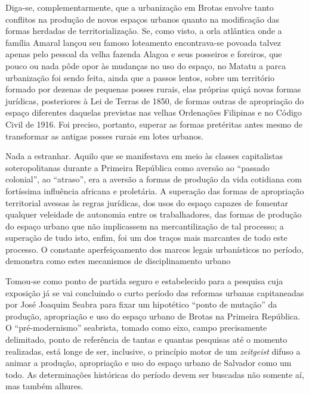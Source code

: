 Diga-se, complementarmente, que a urbanização em Brotas envolve tanto conflitos na produção de novos espaços urbanos quanto na modificação das formas herdadas de territorialização. Se, como visto, a orla atlântica onde a família Amaral lançou seu famoso loteamento encontrava-se povoada talvez apenas pelo pessoal da velha fazenda Alagoa e seus posseiros e foreiros, que pouco ou nada pôde opor às mudanças no uso do espaço, no Matatu a parca urbanização foi sendo feita, ainda que a passos lentos, sobre um território formado por dezenas de pequenas posses rurais, elas próprias quiçá novas formas jurídicas, posteriores à Lei de Terras de 1850, de formas outras de apropriação do espaço diferentes daquelas previstas nas velhas Ordenações Filipinas e no Código Civil de 1916. Foi preciso, portanto, superar as formas pretéritas antes mesmo de transformar as antigas posses rurais em lotes urbanos.

Nada a estranhar. Aquilo que se manifestava em meio às classes capitalistas soteropolitanas durante a Primeira República como aversão ao ``passado colonial'', ao ``atraso'', era a aversão a formas de produção da vida cotidiana com fortíssima influência africana e proletária. A superação das formas de apropriação territorial avessas às regras jurídicas, dos usos do espaço capazes de fomentar qualquer veleidade de autonomia entre os trabalhadores, das formas de produção do espaço urbano que não implicassem na mercantilização de tal processo; a superação de tudo isto, enfim, foi um dos traços mais marcantes de todo este processo. O constante aperfeiçoamento dos marcos legais urbanísticos no período, demonstra como estes mecanismos de disciplinamento urbano 

Tomou-se como ponto de partida seguro e estabelecido para a pesquisa cuja exposição já se vai concluindo o curto período das reformas urbanas capitaneadas por José Joaquim Seabra para fixar um hipotético ``ponto de mutação'' da produção, apropriação e uso do espaço urbano de Brotas na Primeira República. O ``pré-modernismo'' seabrista, tomado como eixo, campo precisamente delimitado, ponto de referência de tantas e quantas pesquisas até o momento realizadas, está longe de ser, inclusive, o princípio motor de um \textit{zeitgeist} difuso a animar a produção, apropriação e uso do espaço urbano de Salvador como um todo. As determinações históricas do período devem ser buscadas não somente aí, mas também alhures.

